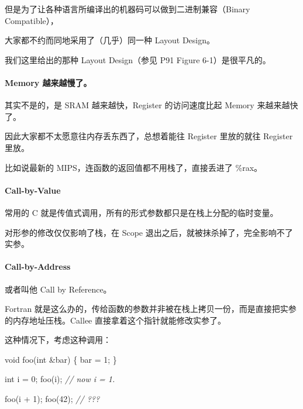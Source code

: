 \documentclass[
]{article}
\newenvironment{Shaded}{}{}
\newcommand{\CommentTok}[1]{\textcolor[rgb]{0.38,0.63,0.69}{\textit{#1}}}
\newcommand{\DataTypeTok}[1]{\textcolor[rgb]{0.56,0.13,0.00}{#1}}
\newcommand{\DecValTok}[1]{\textcolor[rgb]{0.25,0.63,0.44}{#1}}
\newcommand{\NormalTok}[1]{#1}
\begin{document}
但是为了让各种语言所编译出的机器码可以做到二进制兼容（Binary
Compatible），

大家都不约而同地采用了（几乎）同一种 Layout Design。

我们这里给出的那种 Layout Design（参见 P91 Figure 6-1）是很平凡的。

\hypertarget{header-n219}{%
\paragraph{Memory 越来越慢了。}\label{header-n219}}

其实不是的，是 SRAM 越来越快，Register 的访问速度比起 Memory
来越来越快了。

因此大家都不太愿意往内存丢东西了，总想着能往 Register 里放的就往
Register 里放。

比如说最新的 MIPS，连函数的返回值都不用栈了，直接丢进了 \%rax。

\hypertarget{header-n223}{%
\paragraph{Call-by-Value}\label{header-n223}}

常用的 C 就是传值式调用，所有的形式参数都只是在栈上分配的临时变量。

对形参的修改仅仅影响了栈，在 Scope
退出之后，就被抹杀掉了，完全影响不了实参。

\hypertarget{header-n226}{%
\paragraph{Call-by-Address}\label{header-n226}}

或者叫他 Call by Reference。

Fortran
就是这么办的，传给函数的参数并非被在栈上拷贝一份，而是直接把实参的内存地址压栈。Callee
直接拿着这个指针就能修改实参了。

这种情况下，考虑这种调用：

\begin{Shaded}
\begin{Highlighting}[]
\DataTypeTok{void}\NormalTok{ foo(}\DataTypeTok{int}\NormalTok{ &bar) \{}
\NormalTok{    bar = }\DecValTok{1}\NormalTok{;}
\NormalTok{\}}

\DataTypeTok{int}\NormalTok{ i = }\DecValTok{0}\NormalTok{;}
\NormalTok{foo(i);}
\CommentTok{// now i = 1.}

\NormalTok{foo(i + }\DecValTok{1}\NormalTok{);}
\NormalTok{foo(}\DecValTok{42}\NormalTok{);}
\CommentTok{// ???}
\end{Highlighting}
\end{Shaded}
\end{document}
